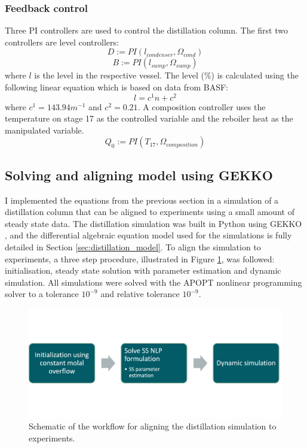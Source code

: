 \subsubsection{Feedback control}

Three PI controllers are used to control the distillation column. The first two controllers are  level controllers:
\begin{equation}
    D := PI(l_{condenser}, \Omega_{cond})
\end{equation}
\begin{equation}
    B := PI(l_{sump}, \Omega_{sump})
\end{equation}
where $l$ is the level in the respective vessel. The level (\%) is calculated using the following linear equation which is based on data from BASF:
\begin{equation}
    l = c^1 n + c^2
\end{equation}
where $c^1=143.94 m^{-1}$ and $c^2=0.21$. A composition controller uses the temperature on stage 17 as the controlled variable and the reboiler heat as the manipulated variable.
\begin{equation}
    Q_0 := PI(T_{17}, \Omega_{composition})
\end{equation}

\subsection{Solving and aligning model using GEKKO}

I implemented the equations from the previous section in a simulation of a distillation column that can be aligned to experiments using a small amount of steady state data. The distillation simulation was built in Python using GEKKO \cite{Beal2018}, and the differential algebraic equation model used for the simulations is fully detailed in Section \ref{sec:distillation_model}. To align the simulation to experiments, a three step procedure, illustrated in Figure \ref{fig:simulation_workflow}, was followed: initialisation, steady state solution with parameter estimation and dynamic simulation. All simulations were solved with the APOPT nonlinear programming solver to a tolerance $10^{-9}$ and relative tolerance $10^{-9}$.

\begin{figure}
    \centering
    \includegraphics[width=\textwidth]{gfx/Chapter06/simulation_workflow.png}
    \caption{Schematic of the workflow for aligning the distillation simulation to experiments.}
    \label{fig:simulation_workflow}
\end{figure}

